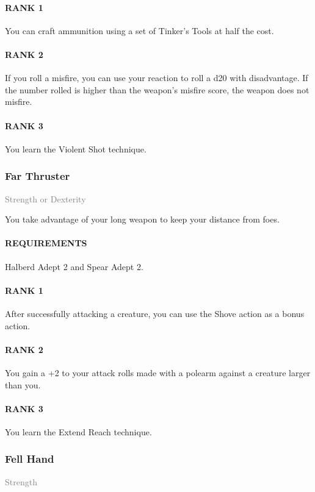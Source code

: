 \paragraph{RANK 1} You can craft ammunition using a set of Tinker's Tools at half the cost.
\paragraph{RANK 2} If you roll a misfire, you can use your reaction to roll a d20 with disadvantage.
If the number rolled is higher than the weapon's misfire score, the weapon does not misfire.
\paragraph{RANK 3} You learn the Violent Shot technique.

\subsubsection{Far Thruster} \label{feat::farthruster}
\small{\textcolor{gray}{Strength or Dexterity}}

\normalsize
You take advantage of your long weapon to keep your distance from foes.
\paragraph{REQUIREMENTS} Halberd Adept 2 and Spear Adept 2.
\paragraph{RANK 1} After successfully attacking a creature, you can use the Shove action as a bonus action.
\paragraph{RANK 2} You gain a +2 to your attack rolls made with a polearm against a creature larger than you.
\paragraph{RANK 3} You learn the Extend Reach technique.

\subsubsection{Fell Hand} \label{feat::fellhand}
\small{\textcolor{gray}{Strength}}

